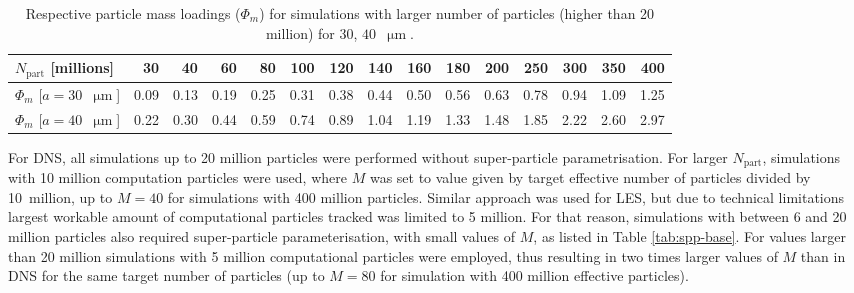 \documentclass{pracamgren}
\begin{document}
\begin{table}[h]
\centering
\scriptsize
\begin{tabular}{lrrrrrrrrrrrrrr}
$N_{\text{part}}$ [millions] & 30 & 40 & 60 & 80 & 100 & 120 & 140 & 160 & 180 & 200 & 250 & 300 & 350 & 400 \\ \hline
$\Phi_m$ [$a = 30$~$\upmu\text{m}$] & 0.09 & 0.13 & 0.19 & 0.25 & 0.31 & 0.38 & 0.44 & 0.50 & 0.56 & 0.63 & 0.78 & 0.94 & 1.09 & 1.25 \\
$\Phi_m$ [$a = 40$~$\upmu\text{m}$] & 0.22 & 0.30 & 0.44 & 0.59 & 0.74 & 0.89 & 1.04 & 1.19 & 1.33 & 1.48 & 1.85 & 2.22 & 2.60 & 2.97 \\
\end{tabular}
\caption{Respective particle mass loadings ($\Phi_m$) for simulations with larger number of particles (higher than 20 million) for $30$, $40$~$\upmu\text{m}$.
}
\label{tab:spp-ext}
\end{table}


For DNS, all simulations up to 20 million particles were performed without super-particle parametrisation.
For larger $N_{\text{part}}$, simulations with 10 million computation particles were used, where $M$ was set to value given by target effective number of particles divided by 10~million, up to $M = 40$ for simulations with 400 million particles.
Similar approach was used for LES, but due to technical limitations largest workable amount of computational particles tracked was limited to 5 million.
For that reason, simulations with between 6 and 20 million particles also required super-particle parameterisation, with small values of $M$, as listed in Table \ref{tab:spp-base}.
For values larger than 20 million simulations with 5 million computational particles were employed, thus resulting in two times larger values of $M$ than in DNS for the same target number of particles (up to $M=80$ for simulation with 400 million effective particles).








\printbibliography[title=References]
\end{document}
